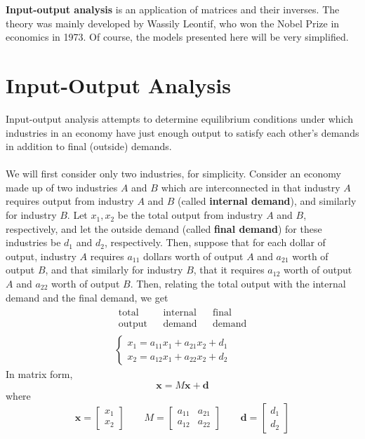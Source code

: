 \documentclass[letterpaper,12pt]{article}
\theoremstyle{definition}
\renewcommand{\vec}[1]{\mathbf{#1}}
\begin{document}
\textbf{Input-output analysis} is an application of matrices and their inverses. The theory was mainly developed by Wassily Leontif, who won the Nobel Prize in economics in 1973. Of course, the models presented here will be very simplified.

\section*{Input-Output Analysis}
Input-output analysis attempts to determine equilibrium conditions under which industries in an economy have just enough output to satisfy each other's demands in addition to final (outside) demands.
\\ \\ We will first consider only two industries, for simplicity. Consider an economy made up of two industries $A$ and $B$ which are interconnected in that industry $A$ requires output from industry $A$ and $B$ (called \textbf{internal demand}), and similarly for industry $B$. Let $x_1, x_2$ be the total output from industry $A$ and $B$, respectively, and let the outside demand (called \textbf{final demand}) for these industries be $d_1$ and $d_2$, respectively. Then, suppose that for each dollar of output, industry $A$ requires $a_{11}$ dollars worth of output $A$ and $a_{21}$ worth of output $B$, and that similarly for industry $B$, that it requires $a_{12}$ worth of output $A$ and $a_{22}$ worth of output $B$. Then, relating the total output with the internal demand and the final demand, we get
\begin{equation*}
    \begin{array}{c}
        \begin{array}{ccccc}
            \text{total} & & \text{internal} & & \text{final} \\
            \text{output} & & \text{demand} & & \text{demand}
        \end{array} \\
        \begin{cases} x_1 = a_{11} x_1 + a_{21} x_2 + d_1 \\ x_2 = a_{12} x_1 + a_{22} x_2 + d_2 \end{cases}
    \end{array}
\end{equation*}
In matrix form,
\begin{equation*}
    \vec{x} = M\vec{x} + \vec{d}
\end{equation*}
where
\begin{equation*}
    \vec{x} = \begin{bmatrix} x_1 \\ x_2 \end{bmatrix} \qquad M = \begin{bmatrix} a_{11} & a_{21} \\ a_{12} & a_{22} \end{bmatrix} \qquad \vec{d} = \begin{bmatrix} d_1 \\ d_2 \end{bmatrix}
\end{equation*}
\end{document}
